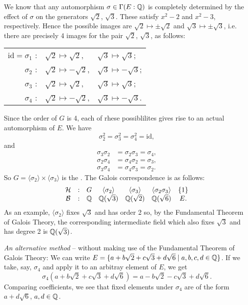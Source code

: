 \begin{example}
	We know that any automorphism $\sigma \in \Gamma(E : \mathbb{Q})$ is completely determined by the effect of $\sigma$ on the generators $\sqrt{2}$, $\sqrt{3}$. These satisfy $x^2 - 2$ and $x^2 - 3$, respectively. Hence the possible images are $\sqrt{2} \mapsto \pm\sqrt{2}$ and $\sqrt{3} \mapsto \pm\sqrt{3}$, i.e. there are precisely 4 images for the pair $\sqrt{2}$, $\sqrt{3}$, as follows:
	\begin{center}
		\begin{tabular}{r l l}
		$\text{id} =\sigma_1$ : & $\sqrt{2} \mapsto \sqrt{2}$, & $\sqrt{3} \mapsto \sqrt{3}$; \\
		$\sigma_2$ : & $\sqrt{2} \mapsto -\sqrt{2}$, & $\sqrt{3} \mapsto -\sqrt{3}$; \\
		$\sigma_3$ : & $\sqrt{2} \mapsto \sqrt{2}$, & $\sqrt{3} \mapsto \sqrt{3}$; \\
		$\sigma_4$ : & $\sqrt{2} \mapsto -\sqrt{2}$, & $\sqrt{3} \mapsto -\sqrt{3}$.
		\end{tabular}
	\end{center}
	Since the order of $G$ is 4, each of rhese possiblilites gives rise to an actual automorphism of $E$. We have
	\[
		\sigma_2^2 = \sigma_3^2 = \sigma_4^2 = \text{id},
	\]
	and
	\begin{align*}
		\sigma_3 \sigma_2 &= \sigma_2 \sigma_3 = \sigma_4, \\
		\sigma_2 \sigma_4 &= \sigma_4 \sigma_2 = \sigma_3, \\
		\sigma_3 \sigma_4 &= \sigma_4 \sigma_3 = \sigma_2.
	\end{align*}
	So $G = \langle \sigma_2 \rangle \times \langle \sigma_3 \rangle$ is the . The Galois correspondence is as follows:
	\[
		\begin{matrix}
			\mathcal{H} & : & G & \langle \sigma_2 \rangle & \langle \sigma_3 \rangle & \langle \sigma_2 \sigma_3 \rangle & \{1\} \\
			\mathcal{B} & : & \mathbb{Q} & \mathbb{Q}(\sqrt{3}) & \mathbb{Q}(\sqrt{2}) & \mathbb{Q}(\sqrt{6}) & E.
		\end{matrix}
	\]
	As an example, $\langle \sigma_2 \rangle$ fixes $\sqrt{3}$ and has order 2 so, by the Fundamental Theorem of Galois Theory, the corresponding intermediate field which also fixes $\sqrt{3}$ and has degree 2 is $\mathbb{Q}(\sqrt{3})$.
	
	\emph{An alternative method} -- without making use of the Fundamental Theorem of Galois Theory: We can write $E = \{a + b\sqrt{2} + c\sqrt{3} + d\sqrt{6} \mid a, b, c, d \in \mathbb{Q}\}$. If we take, say, $\sigma_4$ and apply it to an arbitray element of $E$, we get
	\[
		\sigma_4(a + b\sqrt{2} + c\sqrt{3} + d\sqrt{6}) = a - b\sqrt{2} - c\sqrt{3} + d\sqrt{6}.
	\]
	Comparing coefficients, we see that fixed elements under $\sigma_4$ are of the form $a + d\sqrt{6}$, $a, d \in \mathbb{Q}$.
\end{example}

